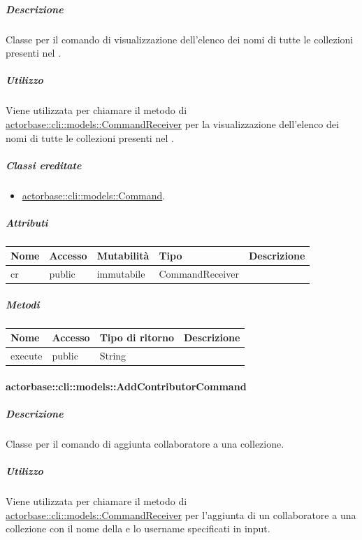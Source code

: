 \documentclass{scalatekids-article}
\begin{document}
\subparagraph{Descrizione}

Classe per il comando di visualizzazione dell'elenco dei nomi di tutte le
collezioni presenti nel .

\subparagraph{Utilizzo}

Viene utilizzata per chiamare il metodo di
\hyperref[sec:actorbase::cli::models::CommandReceiver]{actorbase::cli::models::CommandReceiver} per la visualizzazione dell'elenco dei
nomi di tutte le collezioni presenti nel .

\subparagraph{Classi ereditate}

\begin{itemize}
\item \hyperref[sec:actorbase::cli::models::Command]{actorbase::cli::models::Command}.
\end{itemize}

\subparagraph{Attributi}

\begin{tabular}{| l | l | l | l | l |}
  \hline
  Nome & Accesso & Mutabilità & Tipo & Descrizione\\
  \hline
  cr & public & immutabile & CommandReceiver & \\
  \hline
\end{tabular}

\subparagraph{Metodi}

\begin{tabular}{| l | l | l | l |}
  \hline
  Nome & Accesso & Tipo di ritorno & Descrizione\\
  \hline
  execute & public & String & \\
  \hline
\end{tabular}

\paragraph{actorbase::cli::models::AddContributorCommand}
\label{sec:actorbase::cli::models::AddContributorCommand}

\subparagraph{Descrizione}

Classe per il comando di aggiunta collaboratore a una collezione.

\subparagraph{Utilizzo}

Viene utilizzata per chiamare il metodo di
\hyperref[sec:actorbase::cli::models::CommandReceiver]{actorbase::cli::models::CommandReceiver} per l'aggiunta di un collaboratore a
una collezione con il nome della  e lo username specificati
in input.
\end{document}
